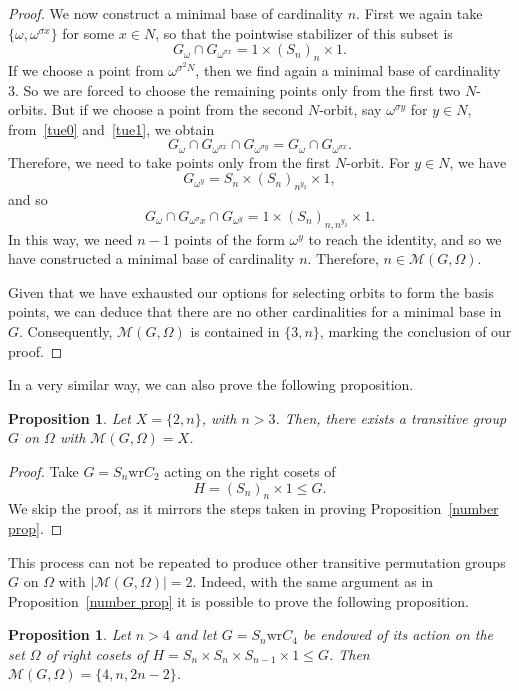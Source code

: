 \documentclass{amsart}
\newtheorem{proposition}[theorem]{Proposition}
\begin{document}
\begin{proof}
		We now construct a minimal base of cardinality $n$. First we again take $\{\omega, \omega^{\sigma x}\}$ for some $x \in N$, so that the pointwise stabilizer of this subset is
		\begin{equation}\label{tue1}
			G_\omega \cap G_{\omega^{\sigma x}} =   1 \times (S_n)_n \times 1.	
		\end{equation}
		If we choose a point from $\omega^{\sigma^2 N}$, then  we find again a minimal base of cardinality $3$. So we are forced to choose the remaining points only from the first two $N$-orbits. But if we choose a point from the second $N$-orbit, say $\omega^{\sigma y}$ for $y \in N$, from~\eqref{tue0} and~\eqref{tue1}, we obtain $$G_\omega \cap G_{\omega^{\sigma x} } \cap G_{\omega^{\sigma y}} = G_\omega \cap G_{\omega^{\sigma x} }.$$ Therefore, we need to take points only from the first $N$-orbit. For $y \in N$, we have
		\[
			G_{\omega^{y}} = S_n \times (S_n)_{n^{y_2}} \times 1 ,
		\] 
		and so
		\[
			G_\omega \cap G_{\omega^\sigma x} \cap G_{\omega^{y}} =
			   1 \times (S_n)_{n,n^{y_2}} \times 1.	
		\]
		In this way, we need $n-1$ points of the form $\omega^y$ to reach the identity, and so we have constructed a minimal base of cardinality $n$. Therefore, $n\in\mathcal{M}(G,\Omega)$.
		
		Given that we have exhausted our options for selecting orbits to form the basis points, we can deduce that there are no other cardinalities for a minimal base in $G$. Consequently, $\mathcal{M}(G, \Omega)$ is contained in $\{3, n\}$, marking the conclusion of our proof.
	\end{proof}
	In a very similar way, we can also prove the following proposition.
	\begin{proposition}
		Let $X = \{2,n\}$, with $n>3$. Then, there exists a transitive group $G$ on $\Omega$ with $\mathcal{M}(G,\Omega) = X$.
	\end{proposition}
	\begin{proof}
		Take $G =S_{n} \mathrm{wr} C_2$ acting on the right cosets of $$H = (S_{n})_n \times 1\leq G.$$
		We skip the proof, as it mirrors the steps taken in proving Proposition~\ref{number prop}.
	\end{proof}
	This process can not be repeated to produce other transitive permutation groups $G$ on $\Omega$ with $|\mathcal{M}(G,\Omega)|=2$. Indeed, with the same argument as in Proposition~\ref{number prop} it is possible to prove the following proposition.
	\begin{proposition}
		Let $n>4$ and let $G = S_n \mathrm{wr} C_4$ be endowed of its action on the set $\Omega$ of right cosets of $H = S_n \times S_n \times S_{n-1} \times 1 \leq G$.
		Then $\mathcal{M}(G,\Omega) =  \{4, n, 2n-2\}$. 
	\end{proposition}
\end{document}
